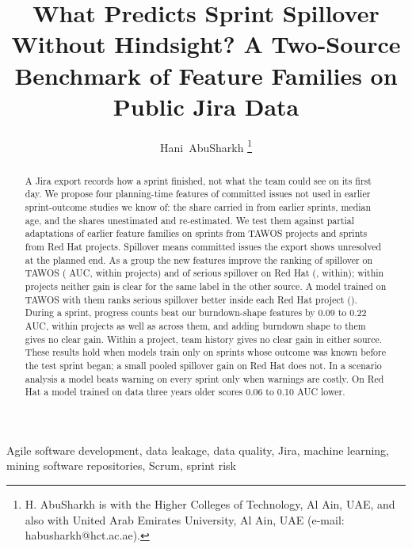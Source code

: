 \documentclass[journal]{IEEEtran}
\begin{document}
\title{What Predicts Sprint Spillover Without Hindsight? A Two-Source Benchmark of Feature Families on Public Jira Data}

\author{Hani~AbuSharkh%
\thanks{H. AbuSharkh is with the Higher Colleges of Technology, Al Ain, UAE, and also with United Arab Emirates University, Al Ain, UAE (e-mail: habusharkh@hct.ac.ae).}}

\maketitle

\begin{abstract}
A Jira export records how a sprint finished, not what the team could see on its first day. We propose four planning-time features of committed issues not used in earlier sprint-outcome studies we know of: the share carried in from earlier sprints, median age, and the shares unestimated and re-estimated. We test them against partial adaptations of earlier feature families on \NSprints{} sprints from \NProj{} TAWOS projects and \RHSprints{} sprints from \RHProj{} Red Hat projects. Spillover means committed issues the export shows unresolved at the planned end. As a group the new features improve the ranking of spillover on TAWOS (\dPTNewSp{} AUC, \dPWNewSp{} within projects) and of serious spillover on Red Hat (\dPXNewSs{}, \dPYNewSs{} within); within projects neither gain is clear for the same label in the other source. A model trained on TAWOS with them ranks serious spillover better inside each Red Hat project (\dPZNewSs). During a sprint, progress counts beat our burndown-shape features by 0.09 to 0.22 AUC, within projects as well as across them, and adding burndown shape to them gives no clear gain. Within a project, team history gives no clear gain in either source. These results hold when models train only on sprints whose outcome was known before the test sprint began; a small pooled spillover gain on Red Hat does not. In a scenario analysis a model beats warning on every sprint only when warnings are costly. On Red Hat a model trained on data three years older scores 0.06 to 0.10 AUC lower.
\end{abstract}

\begin{IEEEkeywords}
Agile software development, data leakage, data quality, Jira, machine learning, mining software repositories, Scrum, sprint risk
\end{IEEEkeywords}
\end{document}
